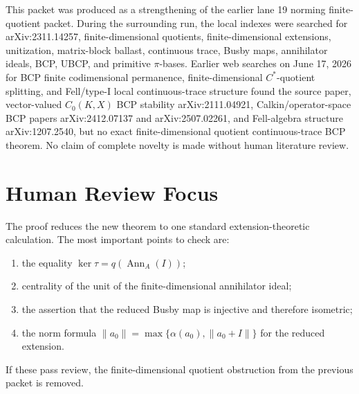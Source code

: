 \documentclass[11pt]{article}
\newcommand{\Ann}{\operatorname{Ann}}
\begin{document}
This packet was produced as a strengthening of the earlier lane 19 norming
finite-quotient packet.  During the surrounding run, the local indexes were
searched for arXiv:2311.14257, finite-dimensional
quotients, finite-dimensional extensions, unitization, matrix-block ballast,
continuous trace, Busby maps, annihilator ideals, BCP, UBCP, and primitive
\(\pi\)-bases.  Earlier web searches on June 17, 2026 for BCP finite
codimensional permanence, finite-dimensional \(C^*\)-quotient splitting, and
Fell/type-I local continuous-trace structure found the source paper,
vector-valued \(C_0(K,X)\) BCP stability arXiv:2111.04921,
Calkin/operator-space BCP papers arXiv:2412.07137 and arXiv:2507.02261, and
Fell-algebra structure arXiv:1207.2540, but no exact finite-dimensional
quotient continuous-trace BCP theorem.  No claim of complete novelty is made
without human literature review.

\section*{Human Review Focus}

The proof reduces the new theorem to one standard extension-theoretic
calculation.  The most important points to check are:
\begin{enumerate}
    \item the equality \(\ker\tau=q(\Ann_A(I))\);
    \item centrality of the unit of the finite-dimensional annihilator ideal;
    \item the assertion that the reduced Busby map is injective and therefore
          isometric;
    \item the norm formula
          \(\|a_0\|=\max\{\alpha(a_0),\|a_0+I\|\}\) for the reduced extension.
\end{enumerate}
If these pass review, the finite-dimensional quotient obstruction from the
previous packet is removed.
\end{document}
